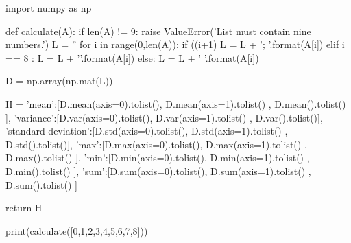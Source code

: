 import numpy as np

def calculate(A):
    if len(A) != 9:
        raise ValueError('List must contain nine numbers.') 
    L = ''
    for i in range(0,len(A)):
         if ((i+1) %
            L = L + '{}; '.format(A[i])
         elif i == 8 :
            L = L + '{}'.format(A[i])
         else:
            L = L + '{} '.format(A[i])
    
    D = np.array(np.mat(L))
    
    H = {
        'mean':[D.mean(axis=0).tolist(), D.mean(axis=1).tolist() , D.mean().tolist() ],
        'variance':[D.var(axis=0).tolist(), D.var(axis=1).tolist() , D.var().tolist()],
        'standard deviation':[D.std(axis=0).tolist(), D.std(axis=1).tolist() , D.std().tolist()],
        'max':[D.max(axis=0).tolist(), D.max(axis=1).tolist() , D.max().tolist() ],
        'min':[D.min(axis=0).tolist(), D.min(axis=1).tolist() , D.min().tolist() ],
        'sum':[D.sum(axis=0).tolist(), D.sum(axis=1).tolist() , D.sum().tolist() ]
        }


    return H
        
        


print(calculate([0,1,2,3,4,5,6,7,8]))
